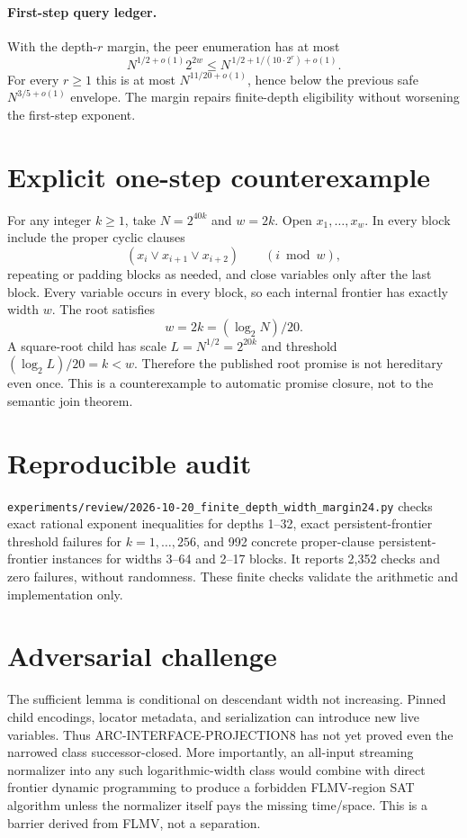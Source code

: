 \documentclass[11pt]{article}
\begin{document}
\paragraph{First-step query ledger.}
With the depth-$r$ margin, the peer enumeration has at most
\[
N^{1/2+o(1)}2^{2w}
 \leq N^{\,1/2+1/(10\cdot 2^r)+o(1)}.
\]
For every $r\geq1$ this is at most $N^{11/20+o(1)}$, hence below the
previous safe $N^{3/5+o(1)}$ envelope. The margin repairs finite-depth
eligibility without worsening the first-step exponent.

\section*{Explicit one-step counterexample}
For any integer $k\geq1$, take $N=2^{40k}$ and $w=2k$. Open
$x_1,\ldots,x_w$. In every block include the proper cyclic clauses
\[
(x_i\vee x_{i+1}\vee x_{i+2})\qquad(i\bmod w),
\]
repeating or padding blocks as needed, and close variables only after the last
block. Every variable occurs in every block, so each internal frontier has
exactly width $w$. The root satisfies
\[
w=2k=(\log_2N)/20.
\]
A square-root child has scale $L=N^{1/2}=2^{20k}$ and threshold
$(\log_2L)/20=k<w$. Therefore the published root promise is not hereditary
even once. This is a counterexample to automatic promise closure, not to the
semantic join theorem.

\section*{Reproducible audit}
\texttt{experiments/review/2026-10-20\_finite\_depth\_width\_margin24.py}
checks exact rational exponent inequalities for depths 1--32, exact
persistent-frontier threshold failures for $k=1,\ldots,256$, and 992 concrete
proper-clause persistent-frontier instances for widths 3--64 and 2--17 blocks.
It reports 2,352 checks and zero failures, without randomness. These finite
checks validate the arithmetic and implementation only.

\section*{Adversarial challenge}
The sufficient lemma is conditional on descendant width not increasing.
Pinned child encodings, locator metadata, and serialization can introduce new
live variables. Thus ARC-INTERFACE-PROJECTION8 has not yet proved even the
narrowed class successor-closed. More importantly, an all-input streaming
normalizer into any such logarithmic-width class would combine with direct
frontier dynamic programming to produce a forbidden FLMV-region SAT algorithm
unless the normalizer itself pays the missing time/space. This is a barrier
derived from FLMV, not a separation.
\end{document}
